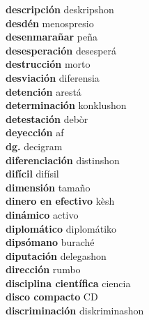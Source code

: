 \textbf{ descripción  } deskripshon \\
\textbf{ desdén  } menospresio \\
\textbf{ desenmarañar  } peña \\
\textbf{ desesperación  } desesperá \\
\textbf{ destrucción  } morto \\
\textbf{ desviación  } diferensia \\
\textbf{ detención  } arestá \\
\textbf{ determinación  } konklushon \\
\textbf{ detestación  } debòr \\
\textbf{ deyección  } af \\
\textbf{ dg.  } decigram \\
\textbf{ diferenciación  } distinshon \\
\textbf{ difícil  } difísil \\
\textbf{ dimensión  } tamaño \\
\textbf{ dinero en efectivo  } kèsh \\
\textbf{ dinámico  } activo \\
\textbf{ diplomático  } diplomátiko \\
\textbf{ dipsómano  } buraché \\
\textbf{ diputación  } delegashon \\
\textbf{ dirección  } rumbo \\
\textbf{ disciplina científica  } ciencia \\
\textbf{ disco compacto  } CD \\
\textbf{ discriminación  } diskriminashon \\
